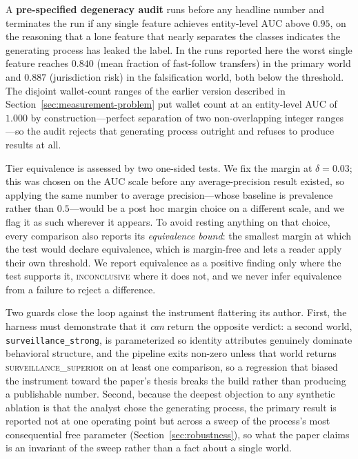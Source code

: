 \documentclass[11pt]{article}
\begin{document}
A \textbf{pre-specified degeneracy audit} runs before any headline number and terminates the run if
any single feature achieves entity-level AUC above $0.95$, on the reasoning that a lone feature that
nearly separates the classes indicates the generating process has leaked the label. In the runs
reported here the worst single feature reaches $0.840$ (mean fraction of fast-follow transfers) in
the primary world and $0.887$ (jurisdiction risk) in the falsification world, both below the
threshold. The disjoint wallet-count ranges of the earlier version described in
Section~\ref{sec:measurement-problem} put wallet count at an entity-level AUC of $1.000$ by
construction---perfect separation of two non-overlapping integer ranges---so the audit rejects that
generating process outright and refuses to produce results at all.

Tier equivalence is assessed by two one-sided tests. We fix the margin at $\delta = 0.03$; this was
chosen on the AUC scale before any average-precision result existed, so applying the same number to
average precision---whose baseline is prevalence rather than $0.5$---would be a post hoc margin
choice on a different scale, and we flag it as such wherever it appears. To avoid resting anything on
that choice, every comparison also reports its \emph{equivalence bound}: the smallest margin at which
the test would declare equivalence, which is margin-free and lets a reader apply their own threshold.
We report equivalence as a positive finding only where the test supports it, \textsc{inconclusive}
where it does not, and we never infer equivalence from a failure to reject a difference.

Two guards close the loop against the instrument flattering its author. First, the harness must
demonstrate that it \emph{can} return the opposite verdict: a second world,
\texttt{surveillance\_strong}, is parameterized so identity attributes genuinely dominate behavioral
structure, and the pipeline exits non-zero unless that world returns \textsc{surveillance\_superior}
on at least one comparison, so a regression that biased the instrument toward the paper's thesis
breaks the build rather than producing a publishable number. Second, because the deepest objection to
any synthetic ablation is that the analyst chose the generating process, the primary result is
reported not at one operating point but across a sweep of the process's most consequential free
parameter (Section~\ref{sec:robustness}), so what the paper claims is an invariant of the sweep
rather than a fact about a single world.
\end{document}
